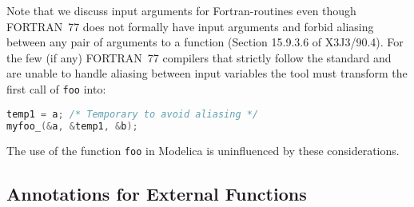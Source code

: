 \begin{example}
Note that we discuss input arguments for Fortran-routines even though FORTRAN~77 does not formally have input arguments and forbid aliasing between any pair of arguments to a function (Section 15.9.3.6 of X3J3/90.4).
For the few (if any) FORTRAN~77 compilers that strictly follow the standard and are unable to handle aliasing between input variables the tool must transform the first call of {\lstinline!foo!} into:
\begin{lstlisting}[language=C]
temp1 = a; /* Temporary to avoid aliasing */
myfoo_(&a, &temp1, &b);
\end{lstlisting}

The use of the function {\lstinline!foo!} in Modelica is uninfluenced by these considerations.
\end{example}

\subsection{Annotations for External Functions}\label{annotations-for-external-libraries-and-include-files}


